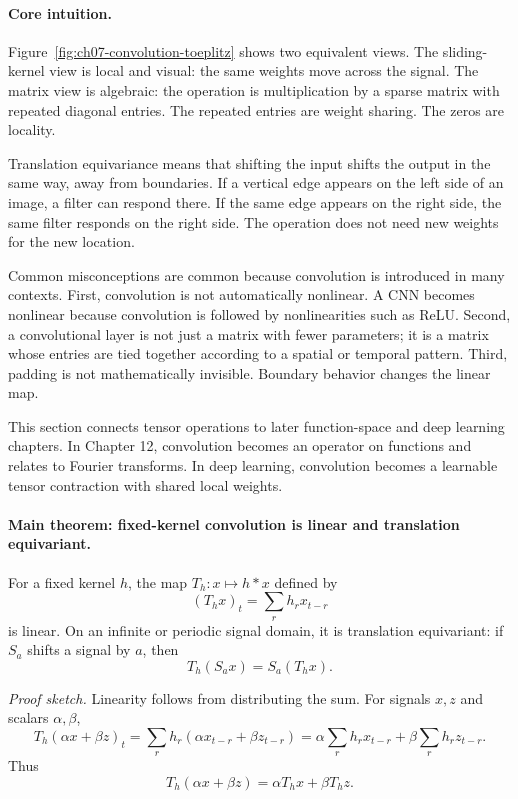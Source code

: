 \paragraph{Core intuition.}
Figure~\ref{fig:ch07-convolution-toeplitz} shows two equivalent views. The sliding-kernel view is local and visual: the same weights move across the signal. The matrix view is algebraic: the operation is multiplication by a sparse matrix with repeated diagonal entries. The repeated entries are weight sharing. The zeros are locality.

Translation equivariance means that shifting the input shifts the output in the same way, away from boundaries. If a vertical edge appears on the left side of an image, a filter can respond there. If the same edge appears on the right side, the same filter responds on the right side. The operation does not need new weights for the new location.

Common misconceptions are common because convolution is introduced in many contexts. First, convolution is not automatically nonlinear. A CNN becomes nonlinear because convolution is followed by nonlinearities such as ReLU. Second, a convolutional layer is not just a matrix with fewer parameters; it is a matrix whose entries are tied together according to a spatial or temporal pattern. Third, padding is not mathematically invisible. Boundary behavior changes the linear map.

This section connects tensor operations to later function-space and deep learning chapters. In Chapter 12, convolution becomes an operator on functions and relates to Fourier transforms. In deep learning, convolution becomes a learnable tensor contraction with shared local weights.

\paragraph{Main theorem: fixed-kernel convolution is linear and translation equivariant.}
For a fixed kernel \(h\), the map \(T_h:x\mapsto h*x\) defined by
\[
(T_hx)_t=\sum_r h_r x_{t-r}
\]
is linear. On an infinite or periodic signal domain, it is translation equivariant: if \(S_a\) shifts a signal by \(a\), then
\[
T_h(S_a x)=S_a(T_hx).
\]

\emph{Proof sketch.} Linearity follows from distributing the sum. For signals \(x,z\) and scalars \(\alpha,\beta\),
\[
T_h(\alpha x+\beta z)_t
=\sum_r h_r(\alpha x_{t-r}+\beta z_{t-r})
=\alpha\sum_r h_rx_{t-r}+\beta\sum_r h_rz_{t-r}.
\]
Thus
\[
T_h(\alpha x+\beta z)=\alpha T_hx+\beta T_hz.
\]

